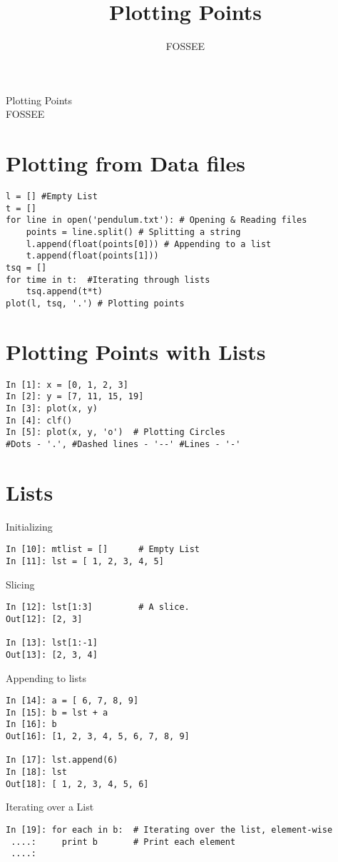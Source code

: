 \documentclass[12pt]{article}
\title{Plotting Points}
\author{FOSSEE}
\begin{document}
\date{}
\vspace{-1in}
\begin{center}
\LARGE{Plotting Points}\\
\large{FOSSEE}
\end{center}
\section{Plotting from Data files}
\begin{verbatim}
l = [] #Empty List
t = []
for line in open('pendulum.txt'): # Opening & Reading files
    points = line.split() # Splitting a string
    l.append(float(points[0])) # Appending to a list
    t.append(float(points[1]))
tsq = []
for time in t:  #Iterating through lists
    tsq.append(t*t)
plot(l, tsq, '.') # Plotting points
\end{verbatim}
\section{Plotting Points with Lists}

\begin{lstlisting}
In [1]: x = [0, 1, 2, 3]
In [2]: y = [7, 11, 15, 19]
In [3]: plot(x, y)
In [4]: clf()
In [5]: plot(x, y, 'o')  # Plotting Circles
#Dots - '.', #Dashed lines - '--' #Lines - '-'
\end{lstlisting}

\section{Lists}

Initializing
  \begin{lstlisting}
In [10]: mtlist = []      # Empty List
In [11]: lst = [ 1, 2, 3, 4, 5] 
  \end{lstlisting}
Slicing
\begin{lstlisting}
In [12]: lst[1:3]         # A slice.
Out[12]: [2, 3]

In [13]: lst[1:-1]
Out[13]: [2, 3, 4]
\end{lstlisting}
Appending to lists
\begin{lstlisting}
In [14]: a = [ 6, 7, 8, 9]
In [15]: b = lst + a
In [16]: b
Out[16]: [1, 2, 3, 4, 5, 6, 7, 8, 9]

In [17]: lst.append(6)
In [18]: lst
Out[18]: [ 1, 2, 3, 4, 5, 6]
\end{lstlisting}

Iterating over a List
\begin{lstlisting}
In [19]: for each in b:  # Iterating over the list, element-wise
 ....:     print b       # Print each element
 ....:
\end{lstlisting}
\end{document}
